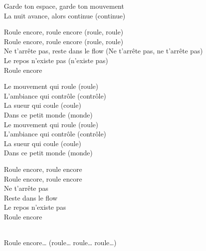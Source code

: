 \begin{lyrics}
Garde ton espace, garde ton mouvement\\
La nuit avance, alors continue (continue)

Roule encore, roule encore (roule, roule)\\
Roule encore, roule encore (roule, roule)\\
Ne t’arrête pas, reste dans le flow
(Ne t’arrête pas, ne t’arrête pas)\\
Le repos n’existe pas (n’existe pas)\\
Roule encore

Le mouvement qui roule (roule)\\
L’ambiance qui contrôle (contrôle)\\
La sueur qui coule (coule)\\
Dans ce petit monde (monde)\\
Le mouvement qui roule (roule)\\
L’ambiance qui contrôle (contrôle)\\
La sueur qui coule (coule)\\
Dans ce petit monde (monde)

Roule encore, roule encore\\
Roule encore, roule encore\\
Ne t’arrête pas\\
Reste dans le flow\\
Le repos n’existe pas\\
Roule encore

\\
Roule encore…
(roule… roule… roule…)
\end{lyrics}


